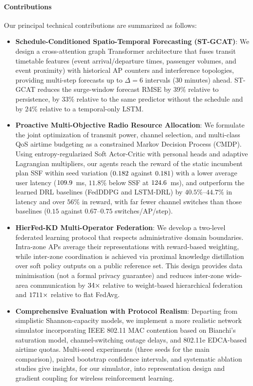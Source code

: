 \paragraph{Contributions} Our principal technical contributions are summarized as follows:
\begin{itemize}
  \item \textbf{Schedule-Conditioned Spatio-Temporal Forecasting (ST-GCAT)}: We design a cross-attention graph Transformer architecture that fuses transit timetable features (event arrival/departure times, passenger volumes, and event proximity) with historical AP counters and interference topologies, providing multi-step forecasts up to $\Delta=6$ intervals (30 minutes) ahead. ST-GCAT reduces the surge-window forecast RMSE by $39\%$ relative to persistence, by $33\%$ relative to the same predictor without the schedule and by $24\%$ relative to a temporal-only LSTM.
  \item \textbf{Proactive Multi-Objective Radio Resource Allocation}: We formulate the joint optimization of transmit power, channel selection, and multi-class QoS airtime budgeting as a constrained Markov Decision Process (CMDP). Using entropy-regularized Soft Actor-Critic with personal heads and adaptive Lagrangian multipliers, our agents reach the reward of the static incumbent plan SSF within seed variation ($0.182$ against $0.181$) with a lower average user latency ($109.9$~ms, $11.8\%$ below SSF at $124.6$~ms), and outperform the learned DRL baselines (FedDDPG and LSTM-DRL) by $40.5\%$--$44.7\%$ in latency and over $56\%$ in reward, with far fewer channel switches than those baselines ($0.15$ against $0.67$--$0.75$ switches/AP/step).
  \item \textbf{HierFed-KD Multi-Operator Federation}: We develop a two-level federated learning protocol that respects administrative domain boundaries. Intra-zone APs average their representations with reward-based weighting, while inter-zone coordination is achieved via proximal knowledge distillation over soft policy outputs on a public reference set. This design provides data minimisation (not a formal privacy guarantee) and reduces inter-zone wide-area communication by $34\times$ relative to weight-based hierarchical federation and $1711\times$ relative to flat FedAvg.
  \item \textbf{Comprehensive Evaluation with Protocol Realism}: Departing from simplistic Shannon-capacity models, we implement a more realistic network simulator incorporating IEEE 802.11 MAC contention based on Bianchi's saturation model, channel-switching outage delays, and 802.11e EDCA-based airtime quotas. Multi-seed experiments (three seeds for the main comparison), paired bootstrap confidence intervals, and systematic ablation studies give insights, for our simulator, into representation design and gradient coupling for wireless reinforcement learning.
\end{itemize}

